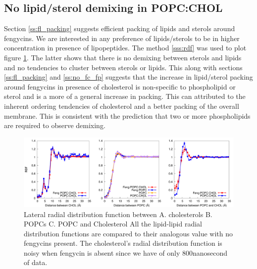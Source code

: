 \subsection{No lipid/sterol demixing in POPC:CHOL}
Section \ref{ss:fl_packing} suggests efficient packing of lipids and sterols around 
fengycins. We are interested in any preference of lipids/sterols to be in higher concentration in presence of lipopeptides. The method \ref{sss:rdf} was used to plot figure \ref{f:xyrdf_cc_pc_pp}. The latter shows that there is no demixing between sterols and lipids and 
no tendencies to cluster between  sterols or lipids. This along with 
sections \ref{ss:fl_packing} and \ref{ss:no_fc_fp} suggests that the increase in 
lipid/sterol packing around fengycins in presence of cholesterol is non-specific to 
phospholipid or sterol and is a more of a general increase in packing. 
This can attributed to the inherent ordering tendencies of 
cholesterol and a better packing of the overall membrane. 
This is consistent with the prediction that two or more phospholipids are required to observe demixing. %

\begin{figure}[h!]
\centering
\includegraphics[width=6in,angle=0,keepaspectratio]{chapter3_figs/xyrdf_all_cc_pc_pp.pdf}
\caption{Lateral radial distribution function between A. cholesterols B. POPCs C. POPC and Cholesterol 
All the lipid-lipid radial distribution functions are compared to their analogous value with no fengycins present. The cholesterol's radial distribution function is noisy when fengycin is absent since we have of only 800nanosecond of data.}
\label{f:xyrdf_cc_pc_pp}
\end{figure}

